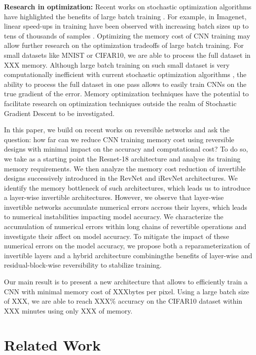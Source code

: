 \documentclass[twocolumn]{bmcart}
\begin{document}
\textbf{Research in optimization:}
Recent works on stochastic optimization algorithms have highlighted the benefits of large batch training \cite{}.
For example, in Imagenet, linear speed-ups in training have been observed with increasing batch sizes up to tens of thousands of samples \cite{}.
Optimizing the memory cost of CNN training may allow further research on the optimization tradeoffs of large batch training.
For small datasets like MNIST or CIFAR10, we are able to process the full dataset in XXX memory.
Although large batch training on such small dataset is very computationally inefficient with current stochastic optimization algorithms \cite{},
the ability to process the full dataset in one pass allows to easily train CNNs on the true gradient of the error.
Memory optimization techniques have the potential to facilitate research on optimization techniques outside the realm of Stochastic Gradient Descent to be investigated.

In this paper, we build on recent works on reversible networks \cite{} and ask the question: 
how far can we reduce CNN training memory cost using reversible designs with minimal impact on the accuracy and computational cost?
To do so, we take as a starting point the Resnet-18 architecture and analyse its training memory requirements.
We then analyze the memory cost reduction of invertible designs successively introduced in the RevNet and iRevNet architectures.
We identify the memory bottleneck of such architectures, which leads us to introduce a layer-wise invertible architectures.
However, we observe that layer-wise invertible networks accumulate numerical errors accross their layers, which leads to numerical instabilities impacting model accuracy.  
We characterize the accumulation of numerical errors within long chains of revertible operations and investigate their affect on model accuracy.
To mitigate the impact of these numerical errors on the model accuracy, we propose both a reparameterization of invertible layers and a hybrid architecture combiningthe benefits of layer-wise and residual-block-wise reversibility to stabilize training.

Our main result is to present a new architecture that allows to efficiently train a CNN with minimal memory cost of XXXbytes per pixel.
Using a large batch size of XXX, we are able to reach XXX\% accuracy on the CIFAR10 dataset within XXX minutes using only XXX of memory. 

\section{Related Work}
\end{document}
